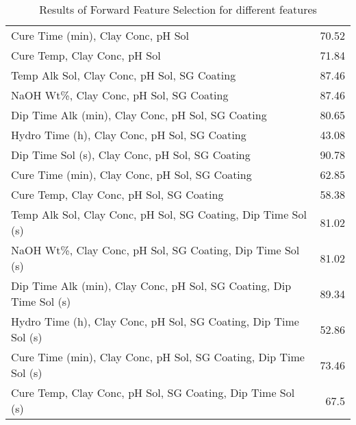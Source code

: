 \begin{table*}[h]
\begin{tabular}{lr}
 Cure Time (min), Clay Conc, pH Sol                                  &  70.52 \\
 Cure Temp, Clay Conc, pH Sol                                        &  71.84 \\
 Temp Alk Sol, Clay Conc, pH Sol, SG Coating                         &  87.46 \\
 NaOH Wt\%, Clay Conc, pH Sol, SG Coating                            &  87.46 \\
 Dip Time Alk (min), Clay Conc, pH Sol, SG Coating                   &  80.65 \\
 Hydro Time (h), Clay Conc, pH Sol, SG Coating                       &  43.08 \\
 Dip Time Sol (s), Clay Conc, pH Sol, SG Coating                     &  90.78 \\
 Cure Time (min), Clay Conc, pH Sol, SG Coating                      &  62.85 \\
 Cure Temp, Clay Conc, pH Sol, SG Coating                            &  58.38 \\
 Temp Alk Sol, Clay Conc, pH Sol, SG Coating, Dip Time Sol (s)       &  81.02 \\
 NaOH Wt\%, Clay Conc, pH Sol, SG Coating, Dip Time Sol (s)          &  81.02 \\
 Dip Time Alk (min), Clay Conc, pH Sol, SG Coating, Dip Time Sol (s) &  89.34 \\
 Hydro Time (h), Clay Conc, pH Sol, SG Coating, Dip Time Sol (s)     &  52.86 \\
 Cure Time (min), Clay Conc, pH Sol, SG Coating, Dip Time Sol (s)    &  73.46 \\
 Cure Temp, Clay Conc, pH Sol, SG Coating, Dip Time Sol (s)          &  67.5  \\
\hline
\end{tabular}
        \caption{Results of Forward Feature Selection for different features}
        \label{forward}
    \end{table*}
    
